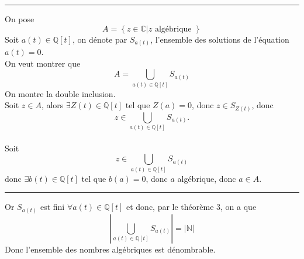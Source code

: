 \documentclass[11pt, a4paper, twoside]{article}
\newcommand\hr{
    \noindent\rule[0.5ex]{\linewidth}{0.5pt}\newline
}
\begin{document}



\hr
On pose
\[ 
A = \left\{ z \in \mathbb{C} | z \text{ algébrique }  \right\}
\]
Soit $a(t) \in \mathbb{Q}[t]$, on dénote par $S_{a(t)}$, l'ensemble des solutions de l'équation $a(t)=0$.\\
On veut montrer que 
\[ 
	A = \bigcup_{a(t) \in \mathbb{Q}[t]} S_{a(t)} 
\]
On montre la double inclusion.\\
Soit $z \in A$, alors $\exists Z(t) \in \mathbb{Q}[t]$ tel que $Z(a)=0$, donc $z \in S_{Z(t)} $, donc 
$$z \in \bigcup_{a(t) \in \mathbb{Q}[t]} S_{a(t)}. $$\\
Soit
$$z \in \bigcup_{a(t) \in \mathbb{Q}[t]} S_{a(t)}  $$
donc $\exists b(t) \in \mathbb{Q}[t]$ tel que $b(a)=0$, donc $a$ algébrique, donc $a \in A$.\\
\hr
Or $ S_{a(t)} $ est fini $\forall a(t) \in \mathbb{Q}[t]$ et donc, par le théorème 3, on a que
\[ 
	|\bigcup_{a(t) \in \mathbb{Q}[t]} S_{a(t)} | = |\mathbb{N}|
\]
Donc l'ensemble des nombres algébriques est dénombrable.
\end{document}
